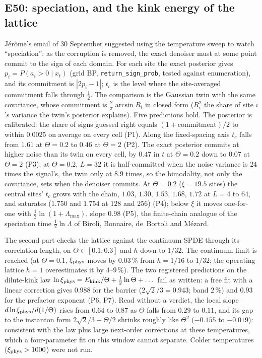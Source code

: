 \documentclass[10pt,a4paper]{article}
\newcommand{\code}[1]{\texttt{\small #1}}
\theoremstyle{plain}
\theoremstyle{remark}
\begin{document}
\subsection{E50: speciation, and the kink energy of the lattice}

Jérôme's email of 30 September suggested using the temperature sweep to watch ``speciation'': as the corruption is removed, the exact denoiser must at some point commit to the sign of each domain. For each site the exact posterior gives $p_i=P(a_i>0\mid x_t)$ (grid BP, \code{return\_sign\_prob}, tested against enumeration), and its commitment is $|2p_i-1|$; $t_c$ is the level where the site-averaged commitment falls through $\tfrac12$. The comparison is the Gaussian twin with the same covariance, whose commitment is $\tfrac2\pi\arcsin R_i$ in closed form ($R_i^2$ the share of site $i$'s variance the twin's posterior explains). Five predictions hold.
The posterior is calibrated: the share of signs guessed right equals $(1+\text{commitment})/2$ to within $0.0025$ on average on every cell (P1). Along the fixed-spacing axis $t_c$ falls from $1.61$ at $\Theta=0.2$ to $0.46$ at $\Theta=2$ (P2). The exact posterior commits at higher noise than its twin on every cell, by $0.47$ in $t$ at $\Theta=0.2$ down to $0.07$ at $\Theta=2$ (P3): at $\Theta=0.2$, $L=32$ it is half-committed when the noise variance is $24$ times the signal's, the twin only at $8.9$ times, so the bimodality, not only the covariance, sets when the denoiser commits. At $\Theta=0.2$ ($\xi=19.5$ sites) the central sites' $t_c$ grows with the chain, $1.03$, $1.30$, $1.53$, $1.68$, $1.72$ at $L=4$ to $64$, and saturates ($1.750$ and $1.754$ at $128$ and $256$) (P4); below $\xi$ it moves one-for-one with $\tfrac12\ln(1+\Lambda_{\max})$, slope $0.98$ (P5), the finite-chain analogue of the speciation time $\tfrac12\ln\Lambda$ of Biroli, Bonnaire, de~Bortoli and Mézard.

The second part checks the lattice against the continuum SPDE through its correlation length, on $\Theta\in[0.1,0.3]$ and $h$ down to $1/32$. The continuum limit is reached (at $\Theta=0.1$, $\xi_{\rm phys}$ moves by $0.03\,\%$ from $h=1/16$ to $1/32$; the operating lattice $h=1$ overestimates it by $4$--$9\,\%$). The two registered predictions on the dilute-kink law $\ln\xi_{\rm phys}=E_{\rm kink}/\Theta+\tfrac12\ln\Theta+\dots$ fail as written: a free fit with a linear correction gives $0.988$ for the barrier ($2\sqrt2/3=0.943$; band $2\,\%$) and $0.93$ for the prefactor exponent (P6, P7). Read without a verdict, the local slope $d\ln\xi_{\rm phys}/d(1/\Theta)$ rises from $0.64$ to $0.87$ as $\Theta$ falls from $0.29$ to $0.11$, and its gap to the instanton form $2\sqrt2/3-\Theta/2$ shrinks roughly like $\Theta^2$ ($-0.155$ to $-0.019$): consistent with the law plus large next-order corrections at these temperatures, which a four-parameter fit on this window cannot separate. Colder temperatures ($\xi_{\rm phys}>1000$) were not run.
\end{document}
